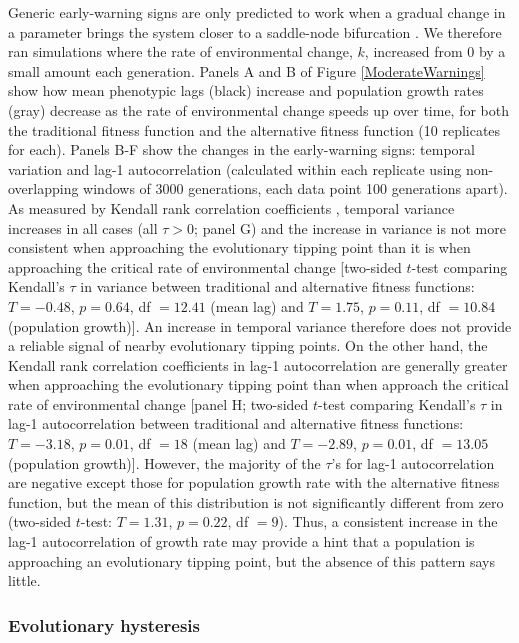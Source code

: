 \documentclass[12pt,letterpaper]{article} %
\begin{document}
Generic early-warning signs are only predicted to work when a gradual change in a parameter brings the system closer to a saddle-node bifurcation \citep{Boettiger2012c}. 
We therefore ran simulations where the rate of environmental change, $k$, increased from 0 by a small amount each generation.
Panels A and B of Figure \ref{ModerateWarnings} show how mean phenotypic lags (black) increase and population growth rates (gray) decrease as the rate of environmental change speeds up over time, for both the traditional fitness function and the alternative fitness function (10 replicates for each).
Panels B-F show the changes in the early-warning signs: temporal variation and lag-1 autocorrelation (calculated within each replicate using non-overlapping windows of 3000 generations, each data point 100 generations apart).
As measured by Kendall rank correlation coefficients \citep{Dakos2008}, temporal variance increases in all cases (all $\tau>0$; panel G) and the increase in variance is not more consistent when approaching the evolutionary tipping point than it is when approaching the critical rate of environmental change [two-sided $t$-test comparing Kendall's $\tau$ in variance between traditional and alternative fitness functions: $T = -0.48$, $p = 0.64$, df $= 12.41$ (mean lag) and $T =1.75$, $p = 0.11$, df $=10.84$ (population growth)].
An increase in temporal variance therefore does not provide a reliable signal of nearby evolutionary tipping points.
On the other hand, the Kendall rank correlation coefficients in lag-1 autocorrelation are generally greater when approaching the evolutionary tipping point than when approach the critical rate of environmental change [panel H; two-sided $t$-test comparing Kendall's $\tau$ in lag-1 autocorrelation between traditional and alternative fitness functions: $T = -3.18$, $p = 0.01$, df $= 18$ (mean lag) and $T =-2.89$, $p = 0.01$, df $= 13.05$  (population growth)].
However, the majority of the $\tau$'s for lag-1 autocorrelation are negative except those for population growth rate with the alternative fitness function, but the mean of this distribution is not significantly different from zero (two-sided $t$-test: $T = 1.31$, $p = 0.22$, df $= 9$).
Thus, a consistent increase in the lag-1 autocorrelation of growth rate may provide a hint that a population is approaching an evolutionary tipping point, but the absence of this pattern says little. 

\subsubsection*{Evolutionary hysteresis}
\end{document}
